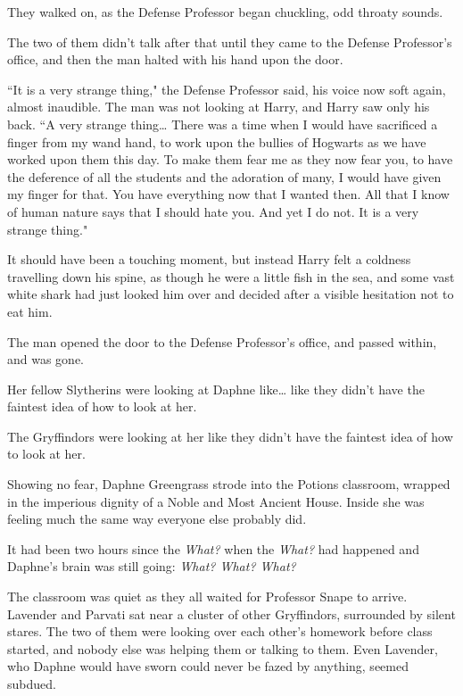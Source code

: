 They walked on, as the Defense Professor began chuckling, odd throaty sounds.

The two of them didn't talk after that until they came to the Defense Professor's office, and then the man halted with his hand upon the door.

``It is a very strange thing," the Defense Professor said, his voice now soft again, almost inaudible. The man was not looking at Harry, and Harry saw only his back. ``A very strange thing{\ldots} There was a time when I would have sacrificed a finger from my wand hand, to work upon the bullies of Hogwarts as we have worked upon them this day. To make them fear me as they now fear you, to have the deference of all the students and the adoration of many, I would have given my finger for that. You have everything now that I wanted then. All that I know of human nature says that I should hate you. And yet I do not. It is a very strange thing."

It should have been a touching moment, but instead Harry felt a coldness travelling down his spine, as though he were a little fish in the sea, and some vast white shark had just looked him over and decided after a visible hesitation not to eat him.

The man opened the door to the Defense Professor's office, and passed within, and was gone.


Her fellow Slytherins were looking at Daphne like{\ldots} like they didn't have the faintest idea of how to look at her.

The Gryffindors were looking at her like they didn't have the faintest idea of how to look at her.

Showing no fear, Daphne Greengrass strode into the Potions classroom, wrapped in the imperious dignity of a Noble and Most Ancient House. Inside she was feeling much the same way everyone else probably did.

It had been two hours since the \emph{What?} when the \emph{What?} had happened and Daphne's brain was still going: \emph{What? What? What?}

The classroom was quiet as they all waited for Professor Snape to arrive. Lavender and Parvati sat near a cluster of other Gryffindors, surrounded by silent stares. The two of them were looking over each other's homework before class started, and nobody else was helping them or talking to them. Even Lavender, who Daphne would have sworn could never be fazed by anything, seemed subdued.

